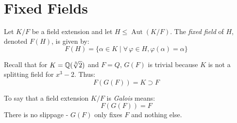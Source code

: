 \documentclass[letterpaper,12pt,fleqn]{article}
\renewcommand{\a}{\alpha}
\newcommand{\vp}{\varphi}
\DeclareMathOperator{\Aut}{Aut}
\DeclareMathOperator{\id}{id}
\begin{document}
\section*{Fixed Fields}

\begin{definition}
  Let $K/F$ be a field extension and let $H\le\Aut(K/F)$. The \emph{fixed field} of $H$,
  denoted $F(H)$, is given by:
  \[F(H)=\{\a\in K\mid\forall\,\vp\in H,\vp(\a)=\a\}\]
\end{definition}


\begin{example}
  Recall that for $K=\mathbb{Q}(\sqrt[3]{2})$ and $F=Q$, $G(F)$ is trivial because $K$ is
  not a splitting field for $x^3-2$. Thus:
  \[F(G(F))=K\supset F\]
\end{example}

\begin{definition}
  To say that a field extension $K/F$ is \emph{Galois} means:
  \[F(G(F))=F\]
  There is no slippage - $G(F)$ only fixes $F$ and nothing else.
\end{definition}
\end{document}
